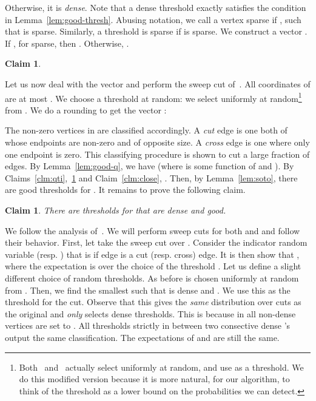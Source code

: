\documentclass[11pt]{article}
\newtheorem{claim}[theorem]{Claim}
\newenvironment{myproof}{\noindent {\sc Proof:}}{}
\begin{document}
\begin{myproof}
Otherwise, it is \emph{dense}.
Note that a dense threshold exactly satisfies the condition
in Lemma~\ref{lem:good-thresh}.
Abusing notation, we call a vertex  sparse if , such
that  is sparse. Similarly, a threshold  is sparse if 
is sparse. We construct a vector .
If , for  sparse, then .
Otherwise, .

\begin{claim} \label{clm:dense} 
\end{claim}

\begin{myproof}

\end{myproof}

Let us now deal with the vector  and perform the sweep cut
of~\cite{Tre09}.
All coordinates of  are at most . We choose a threshold
 at random: we select  uniformly at random\footnote{Both~\cite{Tre09}
and~\cite{Sot09} actually select  uniformly at random, and use  as
a threshold. We do this modified version because it is more natural, for our
algorithm, to think of the threshold as a lower bound on the probabilities
we can detect.} from . We do a rounding
to get the vector :

The non-zero vertices in  are classified accordingly.
A \emph{cut} edge is one both of whose endpoints are non-zero
and of opposite size. A \emph{cross} edge is one where
only one endpoint is zero.
This classifying procedure is shown to cut a large
fraction of edges. By Lemma~\ref{lem:good-q}, we have
 (where 
is some function of  and ).
By Claims~\ref{clm:qti},~\ref{clm:dense} and Claim~\ref{clm:close},
.
Then, by Lemma~\ref{lem:soto}, there are good thresholds for .
It remains to prove the following claim.

\begin{claim} \label{clm:couple} There are thresholds for 
that are dense \emph{and} good.
\end{claim}

\begin{myproof} We follow the analysis of~\cite{Sot09}.
We will perform sweep cuts for both  and 
and follow their behavior.
First, let take the sweep cut over .
Consider the indicator random variable  (resp. ) that is 
if edge  is a cut (resp. cross) edge. It is then
show that ,
where the expectation is over the choice of the threshold .
Let us define a slight different choice of random thresholds.
As before  is chosen uniformly at random from .
Then, we find the smallest  such that  is dense
and . We use this  as the threshold for the cut.
Observe that this gives the \emph{same} distribution over
cuts as the original and \emph{only} selects dense thresholds. This is because in  all non-dense
vertices are set to . All thresholds strictly in
between two consective dense 's output the same
classification. The expectations of  and 
are still the same.


\end{myproof}
\end{myproof}
\end{document}
